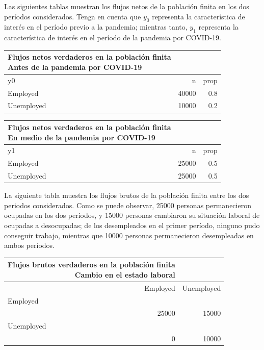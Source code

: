 \documentclass[
  12pt,
]{book}
\begin{document}
Las siguientes tablas muestran los flujos netos de la población finita en los dos períodos considerados. Tenga en cuenta que \(y_0\) representa la característica de interés en el período previo a la pandemia; mientras tanto, \(y_1\) representa la característica de interés en el período de la pandemia por COVID-19.

\begin{longtable}{lrr}
\caption*{
{\large Flujos netos verdaderos en la población finita} \\ 
{\small Antes de la pandemia por COVID-19}
} \\ 
\toprule
y0 & n & prop \\ 
\midrule
Employed & 40000 & 0.8 \\ 
Unemployed & 10000 & 0.2 \\ 
\bottomrule
\end{longtable}
\begin{longtable}{lrr}
\caption*{
{\large Flujos netos verdaderos en la población finita} \\ 
{\small En medio de la pandemia por COVID-19}
} \\ 
\toprule
y1 & n & prop \\ 
\midrule
Employed & 25000 & 0.5 \\ 
Unemployed & 25000 & 0.5 \\ 
\bottomrule
\end{longtable}

La siguiente tabla muestra los flujos brutos de la población finita entre los dos periodos considerados. Como se puede observar, 25000 personas permanecieron ocupadas en los dos periodos, y 15000 personas cambiaron su situación laboral de ocupadas a desocupadas; de los desempleados en el primer período, ninguno pudo conseguir trabajo, mientras que 10000 personas permanecieron desempleadas en ambos períodos.

\begin{longtable}{rr}
\caption*{
{\large Flujos brutos verdaderos en la población finita} \\ 
{\small Cambio en el estado laboral}
} \\ 
\toprule
Employed & Unemployed \\ 
\midrule
\multicolumn{2}{l}{Employed} \\ 
\midrule
25000 & 15000 \\ 
\midrule
\multicolumn{2}{l}{Unemployed} \\ 
0 & 10000 \\ 
\bottomrule
\end{longtable}
\end{document}
